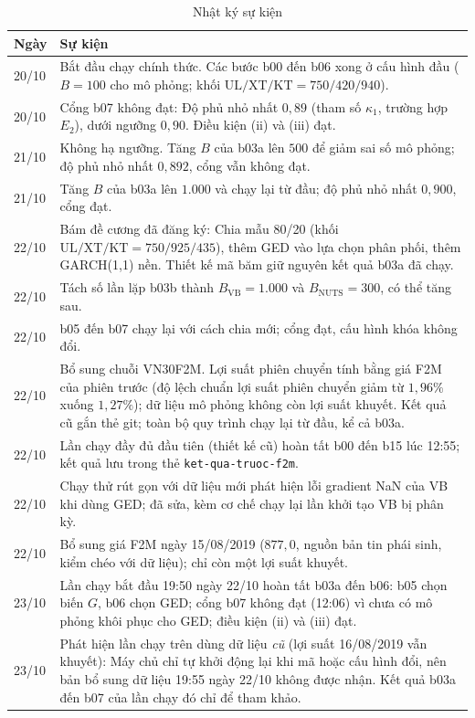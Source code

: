 \documentclass[12pt,a4paper]{article}
\theoremstyle{remark}
\newcommand{\ma}[1]{\texttt{\small #1}}
\newcommand{\UL}{\mathrm{UL}}
\newcommand{\XT}{\mathrm{XT}}
\newcommand{\KT}{\mathrm{KT}}
\begin{document}
\begin{table}[h]
\centering
\caption{Nhật ký sự kiện}\label{tab:suKien}
\begin{tabular}{@{}lp{12.6cm}@{}}
\toprule
\textbf{Ngày} & \textbf{Sự kiện} \\
\midrule
20/10 & Bắt đầu chạy chính thức. Các bước b00 đến b06 xong ở cấu hình đầu ($B=100$ cho mô phỏng; khối $\UL/\XT/\KT=750/420/940$). \\
20/10 & Cổng b07 không đạt: Độ phủ nhỏ nhất $0{,}89$ (tham số $\kappa_1$, trường hợp $E_2$), dưới ngưỡng $0{,}90$. Điều kiện (ii) và (iii) đạt. \\
21/10 & Không hạ ngưỡng. Tăng $B$ của b03a lên $500$ để giảm sai số mô phỏng; độ phủ nhỏ nhất $0{,}892$, cổng vẫn không đạt. \\
21/10 & Tăng $B$ của b03a lên $1.000$ và chạy lại từ đầu; độ phủ nhỏ nhất $0{,}900$, cổng đạt. \\
22/10 & Bám đề cương đã đăng ký: Chia mẫu 80/20 (khối $\UL/\XT/\KT=750/925/435$), thêm GED vào lựa chọn phân phối, thêm GARCH(1,1) nền. Thiết kế mã băm giữ nguyên kết quả b03a đã chạy. \\
22/10 & Tách số lần lặp b03b thành $B_{\mathrm{VB}}=1.000$ và $B_{\mathrm{NUTS}}=300$, có thể tăng sau. \\
22/10 & b05 đến b07 chạy lại với cách chia mới; cổng đạt, cấu hình khóa không đổi. \\
22/10 & Bổ sung chuỗi VN30F2M. Lợi suất phiên chuyển tính bằng giá F2M của phiên trước (độ lệch chuẩn lợi suất phiên chuyển giảm từ $1{,}96\%$ xuống $1{,}27\%$); dữ liệu mô phỏng không còn lợi suất khuyết. Kết quả cũ gắn thẻ git; toàn bộ quy trình chạy lại từ đầu, kể cả b03a. \\
22/10 & Lần chạy đầy đủ đầu tiên (thiết kế cũ) hoàn tất b00 đến b15 lúc 12:55; kết quả lưu trong thẻ \ma{ket-qua-truoc-f2m}. \\
22/10 & Chạy thử rút gọn với dữ liệu mới phát hiện lỗi gradient NaN của VB khi dùng GED; đã sửa, kèm cơ chế chạy lại lần khởi tạo VB bị phân kỳ. \\
22/10 & Bổ sung giá F2M ngày 15/08/2019 ($877{,}0$, nguồn bản tin phái sinh, kiểm chéo với dữ liệu); chỉ còn một lợi suất khuyết. \\
23/10 & Lần chạy bắt đầu 19:50 ngày 22/10 hoàn tất b03a đến b06: b05 chọn biến $G$, b06 chọn GED; cổng b07 không đạt (12:06) vì chưa có mô phỏng khôi phục cho GED; điều kiện (ii) và (iii) đạt. \\
23/10 & Phát hiện lần chạy trên dùng dữ liệu \emph{cũ} (lợi suất 16/08/2019 vẫn khuyết): Máy chủ chỉ tự khởi động lại khi mã hoặc cấu hình đổi, nên bản bổ sung dữ liệu 19:55 ngày 22/10 không được nhận. Kết quả b03a đến b07 của lần chạy đó chỉ để tham khảo. \\

\end{tabular}
\end{table}
\end{document}

